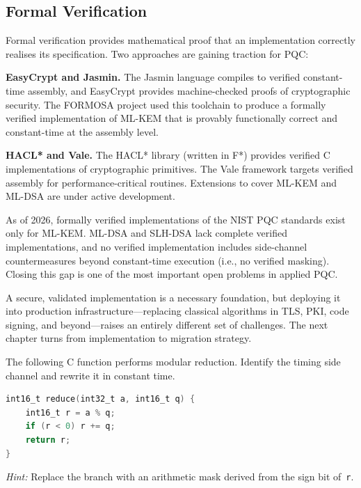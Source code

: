 \subsection{Formal Verification}
\label{subsec:formal-verification}

Formal verification provides mathematical proof that an implementation correctly realises its specification.  Two approaches are gaining traction for PQC:

\textbf{EasyCrypt and Jasmin.}  The Jasmin language compiles to verified constant-time assembly, and EasyCrypt provides machine-checked proofs of cryptographic security.  The FORMOSA project used this toolchain to produce a formally verified implementation of ML-KEM that is provably functionally correct and constant-time at the assembly level.

\textbf{HACL* and Vale.}  The HACL* library (written in F*) provides verified C implementations of cryptographic primitives.  The Vale framework targets verified assembly for performance-critical routines.  Extensions to cover ML-KEM and ML-DSA are under active development.

\begin{remark}
As of 2026, formally verified implementations of the NIST PQC standards exist only for ML-KEM.  ML-DSA and SLH-DSA lack complete verified implementations, and no verified implementation includes side-channel countermeasures beyond constant-time execution (i.e., no verified masking).  Closing this gap is one of the most important open problems in applied PQC.
\end{remark}

A secure, validated implementation is a necessary foundation, but deploying it into production infrastructure---replacing classical algorithms in TLS, PKI, code signing, and beyond---raises an entirely different set of challenges.  The next chapter turns from implementation to migration strategy.



\begin{prob}
\label{prob:ch12-timing}
The following C function performs modular reduction.  Identify the timing side channel and rewrite it in constant time.
\begin{lstlisting}[language=C]
int16_t reduce(int32_t a, int16_t q) {
    int16_t r = a % q;
    if (r < 0) r += q;
    return r;
}
\end{lstlisting}
\textit{Hint:} Replace the branch with an arithmetic mask derived from the sign bit of~\texttt{r}.
\end{prob}


